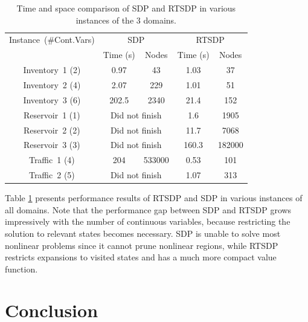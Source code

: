 \documentclass[letterpaper]{article}
\begin{document}
\begin{table}[!ht]
\centering
\scriptsize
\begin{tabular}{c|cc|cc}
	\toprule
	Instance~(\#Cont.Vars)	 & \multicolumn{2}{c|}{SDP} & \multicolumn{2}{c}{RTSDP}  \\  \cmidrule{2-5}
	 & Time (s) & Nodes & Time (s) & Nodes \\ \midrule
	Inventory~1 (2)  & 0.97 & 43 & 1.03 & 37\\%
	Inventory~2 (4) & 2.07 & 229 & 1.01 & 51\\
	Inventory~3 (6) & 202.5 & 2340 & 21.4 & 152\\ \bottomrule \toprule
	Reservoir~1 (1) & \multicolumn{2}{c|}{Did not finish} & 1.6 & 1905\\
	Reservoir~2 (2) & \multicolumn{2}{c|}{Did not finish} & 11.7 & 7068\\
	Reservoir~3 (3) & \multicolumn{2}{c|}{Did not finish} & 160.3 & 182000\\ \bottomrule \toprule
	Traffic~1 (4) & 204 & 533000 & 0.53 & 101\\
	Traffic~2 (5) & \multicolumn{2}{c|}{Did not finish} & 1.07 & 313\\ \bottomrule
\end{tabular}
\caption{\small Time and space comparison of SDP and RTSDP in various instances of the 3 domains.}
\label{tab:all}
\end{table}

Table \ref{tab:all} presents performance results of RTSDP and SDP in various instances of all domains. Note that the performance gap between SDP and RTSDP grows impressively with the number of continuous variables, because restricting the solution to relevant states becomes necessary. SDP is unable to solve most nonlinear problems since it cannot prune nonlinear regions, while RTSDP restricts expansions to visited states and has a much more compact value function.

\section{Conclusion}
\end{document}
